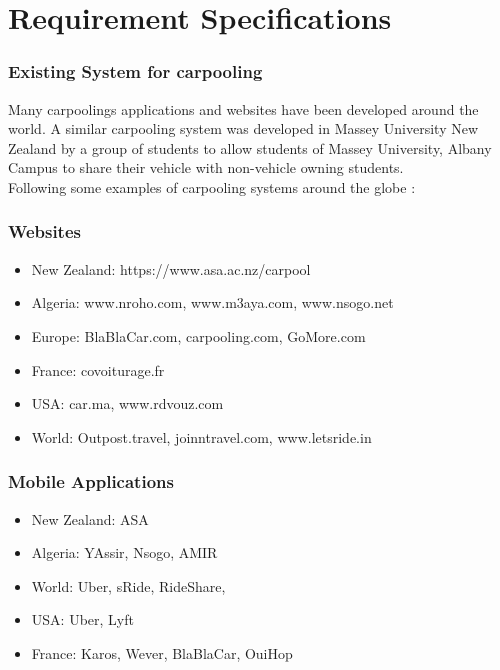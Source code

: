 \chapter{Requirement Specifications} \label{chap:reqs}

\subsection{Existing System for carpooling}
\justify
Many carpoolings applications and websites have been developed around the world. A similar carpooling system was developed in Massey University New Zealand by a group of students to allow students of Massey University, Albany Campus to share their vehicle with non-vehicle owning students.
\\Following some examples of carpooling systems around the globe : 

\subsection{Websites}
\begin{itemize}

\item New Zealand: https://www.asa.ac.nz/carpool
\item Algeria: www.nroho.com, www.m3aya.com, www.nsogo.net
\item Europe: BlaBlaCar.com, carpooling.com, GoMore.com
\item France: covoiturage.fr
\item USA: car.ma, www.rdvouz.com
\item World: Outpost.travel, joinntravel.com, www.letsride.in

\end{itemize}

\subsection{Mobile Applications}
\begin{itemize}

\item New Zealand: ASA
\item Algeria: YAssir, Nsogo, AMIR
\item World: Uber, sRide, RideShare, 
\item USA: Uber, Lyft
\item France: Karos, Wever, BlaBlaCar, OuiHop

\end{itemize}
